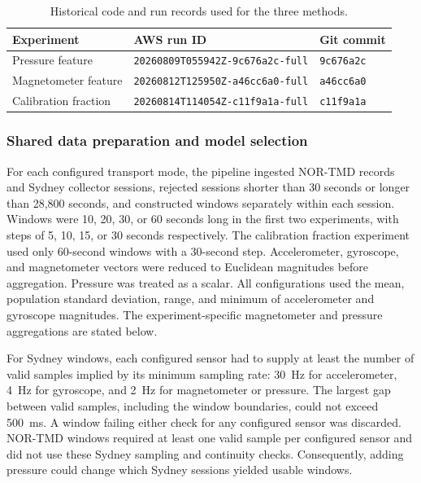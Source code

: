 \begin{table}[htbp]
\centering
\small
\caption{Historical code and run records used for the three methods.}
\label{tab:preliminary-methodology-runs}
\begin{tabular}{lll}
\hline
\textbf{Experiment} & \textbf{AWS run ID} & \textbf{Git commit} \\
\hline
Pressure feature & \texttt{20260809T055942Z-9c676a2c-full} & \texttt{9c676a2c} \\
Magnetometer feature & \texttt{20260812T125950Z-a46cc6a0-full} & \texttt{a46cc6a0} \\
Calibration fraction & \texttt{20260814T114054Z-c11f9a1a-full} & \texttt{c11f9a1a} \\
\hline
\end{tabular}
\end{table}

\subsubsection{Shared data preparation and model selection}

For each configured transport mode, the pipeline ingested NOR-TMD records and
Sydney collector sessions, rejected sessions shorter than 30 seconds or longer
than 28,800 seconds, and constructed windows separately within each session.
Windows were 10, 20, 30, or 60 seconds long in the first two experiments, with
steps of 5, 10, 15, or 30 seconds respectively. The calibration fraction
experiment used only 60-second windows with a 30-second step. Accelerometer,
gyroscope, and magnetometer vectors were reduced to Euclidean magnitudes before
aggregation. Pressure was treated as a scalar. All configurations used the
mean, population standard deviation, range, and minimum of accelerometer and
gyroscope magnitudes. The experiment-specific magnetometer and pressure
aggregations are stated below.

For Sydney windows, each configured sensor had to supply at least the number of
valid samples implied by its minimum sampling rate: 30~Hz for accelerometer,
4~Hz for gyroscope, and 2~Hz for magnetometer or pressure. The largest gap
between valid samples, including the window boundaries, could not exceed
500~ms. A window failing either check for any configured sensor was discarded.
NOR-TMD windows required at least one valid sample per configured sensor and
did not use these Sydney sampling and continuity checks. Consequently, adding
pressure could change which Sydney sessions yielded usable windows.

